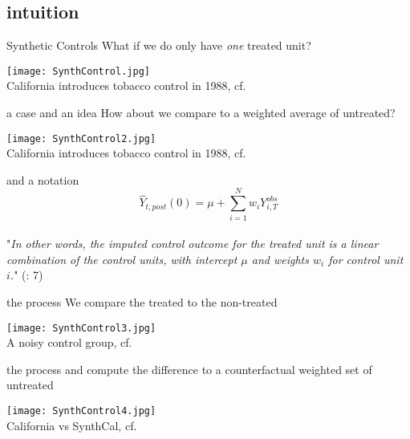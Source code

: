 \documentclass[aspectratio=169]{beamer}
\begin{document}
	\subsection{intuition}

		\begin{frame}{Synthetic Controls}
			What if we do only have \textit{one} treated unit?
			\begin{center}
				\texttt{[image: SynthControl.jpg]}
				\\\tiny{California introduces tobacco control in 1988, cf. \cite{Abadie2010}}
			\end{center}
		\end{frame}

		\begin{frame}{a case and an idea}
			How about we compare to a weighted average of untreated?
			\begin{center}
				\texttt{[image: SynthControl2.jpg]}
				\\\tiny{California introduces tobacco control in 1988, cf. \cite{Abadie2010}}
			\end{center}
		\end{frame}

		\begin{frame}{and a notation}
			\begin{equation}
				\hat Y_{t,post}(0)  = \mu + \sum_{i=1}^{N}{w_iY_{i,T}^{obs}}
			\end{equation}
			\\ \vspace*{1.5cm}
			"\textit{In other words, the imputed control outcome for the treated unit is a linear combination of the control units, with intercept $\mu$ and weights $w_i$ for control unit $i$.}" (\cite{Doudchenko2016}: 7)
		\end{frame}

		\begin{frame}{the process}
			We compare the treated to the non-treated
			\begin{center}
				\texttt{[image: SynthControl3.jpg]}
				\\\tiny{A noisy control group, cf. \cite{Abadie2010}}
			\end{center}
		\end{frame}

		\begin{frame}{the process}
			and compute the difference to a counterfactual weighted set of untreated
			\begin{center}
				\texttt{[image: SynthControl4.jpg]}
				\\\tiny{California vs SynthCal, cf. \cite{Abadie2010}}
			\end{center}
		\end{frame}
\end{document}
